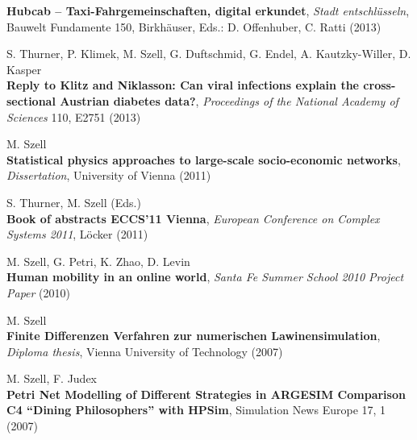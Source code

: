 \documentclass[10pt,a4paper]{article}
\renewenvironment{itemize}{
  \begin{list}{}{
    \setlength{\leftmargin}{1.5em}
    \setlength{\itemsep}{0.25em}
    \setlength{\parskip}{0pt}
    \setlength{\parsep}{0.25em}
  }
}{
  \end{list}
}
\begin{document}
\begin{itemize}
    \textbf{Hubcab -- Taxi-Fahrgemeinschaften, digital erkundet}, \textit{Stadt entschl\"usseln}, Bauwelt Fundamente 150, Birkh\"auser, Eds.: D. Offenhuber, C. Ratti (2013)
\item S. Thurner, P. Klimek, M. Szell, G. Duftschmid, G. Endel, A. Kautzky-Willer, D. Kasper\\
    \textbf{Reply to Klitz and Niklasson: Can viral infections explain the cross-sectional Austrian diabetes data?}, \textit{Proceedings of the National Academy of Sciences} 110, E2751 (2013)
\item M. Szell\\
    \textbf{Statistical physics approaches to large-scale socio-economic networks}, \textit{Dissertation}, University of Vienna (2011)
\item S. Thurner, M. Szell (Eds.)\\
    \textbf{Book of abstracts ECCS{'}11 Vienna}, \textit{European Conference on Complex Systems 2011}, L\"ocker (2011)
\item M. Szell, G. Petri, K. Zhao, D. Levin\\
    \textbf{Human mobility in an online world}, \textit{Santa Fe Summer School 2010 Project Paper} (2010)
\item M. Szell\\
    \textbf{Finite Differenzen Verfahren zur numerischen Lawinensimulation}, \textit{Diploma thesis}, Vienna University of Technology (2007)
\item M. Szell, F. Judex\\
    \textbf{Petri Net Modelling of Different Strategies in ARGESIM Comparison C4 ``Dining Philosophers'' with HPSim}, Simulation News Europe 17, 1 (2007)
\end{itemize}
\end{document}
